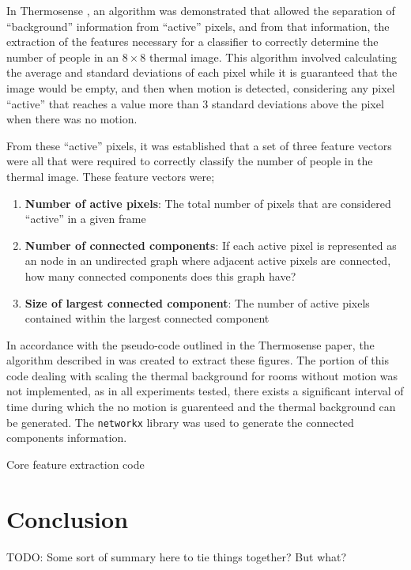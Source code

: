 \documentclass[../thesis/thesis.tex]{subfiles}
\begin{document}
In Thermosense \cite{beltran2013thermosense}, an algorithm was demonstrated that allowed the separation of ``background'' information from ``active'' pixels, and from that information, the extraction of the features necessary for a classifier to correctly determine the number of people in an $8\times8$ thermal image. This algorithm involved calculating the average and standard deviations of each pixel while it is guaranteed that the image would be empty, and then when motion is detected, considering any pixel ``active'' that reaches a value more than 3 standard deviations above the pixel when there was no motion.

From these ``active'' pixels, it was established that a set of three feature vectors were all that were required to correctly classify the number of people in the thermal image. These feature vectors were;
\begin{enumerate}
\item \textbf{Number of active pixels}: The total number of pixels that are considered ``active'' in a given frame
\item \textbf{Number of connected components}: If each active pixel is represented as an node in an undirected graph where adjacent active pixels are connected, how many connected components does this graph have?
\item \textbf{Size of largest connected component}: The number of active pixels contained within the largest connected component
\end{enumerate}

In accordance with the pseudo-code outlined in the Thermosense paper, the algorithm described in  was created to extract these figures. The portion of this code dealing with scaling the thermal background for rooms without motion was not implemented, as in all experiments tested, there exists a significant interval of time during which the no motion is guarenteed and the thermal background can be generated. The \texttt{networkx} library was used to generate the connected components information.

\begin{listing}
\centering

\caption{Core feature extraction code}
\label{lst:exps:featcode}
\end{listing}


\section{Conclusion}
TODO: Some sort of summary here to tie things together? But what?
 
\end{document}
